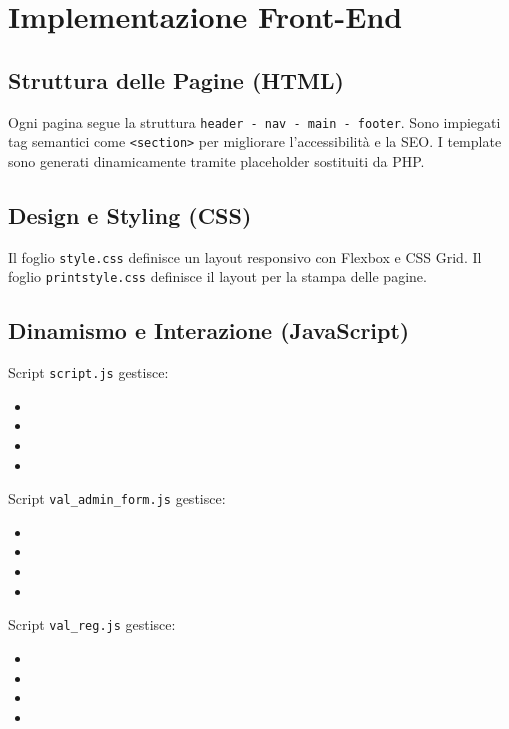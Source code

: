 \documentclass{article}
\begin{document}
\newpage

\section{Implementazione Front-End}

\subsection{Struttura delle Pagine (HTML)}
Ogni pagina segue la struttura \texttt{header - nav - main - footer}.  
Sono impiegati tag semantici come \texttt{<section>} per migliorare l'accessibilità e la SEO.  
I template sono generati dinamicamente tramite placeholder sostituiti da PHP.


\subsection{Design e Styling (CSS)}
Il foglio \texttt{style.css} definisce un layout responsivo con Flexbox e CSS Grid. 
Il foglio \texttt{printstyle.css} definisce il layout per la stampa delle pagine. 




\subsection{Dinamismo e Interazione (JavaScript)}
Script \texttt{script.js} gestisce:

\begin{itemize}
    \item 
    \item
    \item 
    \item 
\end{itemize}

Script \texttt{val\_admin\_form.js} gestisce:

\begin{itemize}
    \item 
    \item
    \item 
    \item 
\end{itemize}

Script \texttt{val\_reg.js} gestisce:

\begin{itemize}
    \item 
    \item
    \item 
    \item 
\end{itemize}
\end{document}
